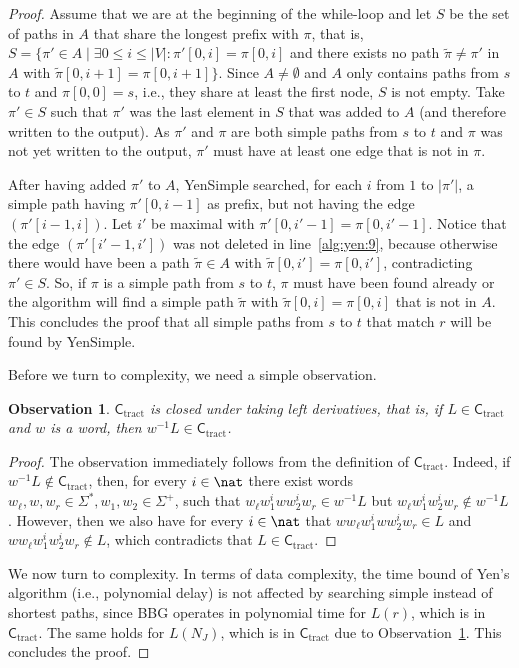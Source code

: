 \documentclass[a4paper,english]{lipics-v2016}
\newcommand{\ctract}{\ensuremath{\textsf{C}_\text{tract}}\xspace}
\theoremstyle{plain}
\newtheorem{observation}[theorem]{Observation}
\begin{document}
\begin{proof}
  Assume that we are at the beginning of the while-loop and let $S$ be
  the set of paths in $A$ that share the longest prefix with $\pi$,
  that is, $S =\{\pi' \in A \mid \exists 0 \leq i \leq |V|:
  \pi'[0,i]=\pi[0,i]$ and there exists no path $\tilde{\pi}\neq \pi'$
  in $A$ with $\tilde{\pi}[0,i+1]=\pi[0,i+1]\}$. Since $A \neq
  \emptyset$ and $A$ only contains paths from $s$ to $t$ and
  $\pi[0,0]=s$, i.e., they share at least the first node, $S$ is not
  empty. Take $\pi' \in S$ such that $\pi'$ was the last element in
  $S$ that was added to $A$ (and therefore written to the output).  As
  $\pi'$ and $\pi$ are both simple paths from $s$ to $t$ and $\pi$ was
  not yet written to the output, $\pi'$ must have at least one edge
  that is not in $\pi$.

  After having added $\pi'$ to $A$, YenSimple searched, for each $i$
  from $1$ to $|\pi'|$, a simple path having $\pi'[0,i-1]$ as prefix, but
  not having the edge $(\pi'[i-1,i])$. Let $i'$ be maximal with
  $\pi'[0,i'-1]=\pi[0,i'-1]$.  Notice that the edge $(\pi'[i'-1,i'])$ was
  not deleted in line~\ref{alg:yen:9}, because otherwise there would
  have been a path $\tilde{\pi} \in A$ with $\tilde{\pi}[0,i'] = \pi[0,i']$,
  contradicting $\pi' \in S$.  So, if $\pi$ is a simple path from $s$ to $t$, $\pi$
  must have been found already or the algorithm will find a
  simple path $\tilde{\pi}$ with $\tilde{\pi}[0,i] = \pi[0,i]$ that is
  not in $A$. This concludes the proof that all simple paths from $s$ to $t$ that
  match $r$ will be found by YenSimple.

 
  Before we turn to complexity, we need a simple observation. 
  \begin{observation}\label{obs:ctract-derivative}
    \ctract is closed under taking left derivatives, that is, if $L
    \in \ctract$ and $w$ is a word, then $w^{-1} L \in \ctract$.
  \end{observation}
  \begin{proof}
    The observation immediately follows from the definition of
    \ctract. Indeed, if $w^{-1}L \notin \ctract$, then, for every $i \in
    \nat$ there exist words $w_\ell, w,w_r \in \Sigma^*, w_1, w_2 \in
    \Sigma^+$, such that $w_\ell w_1^i w w_2^i w_r \in w^{-1}L$ but
    $w_\ell w_1^i w_2^i w_r \notin w^{-1}L$. However, then we also
    have for every $i \in \nat$ that
    $w w_\ell w_1^i w w_2^i w_r \in L$ and $ww_\ell w_1^i w_2^i
    w_r \notin L$, which contradicts that $L \in \ctract$.
  \end{proof}

  We now turn to complexity. In terms of data complexity, the time
  bound of Yen's algorithm (i.e., polynomial delay) is not affected by
  searching simple instead of shortest paths, since BBG operates in
  polynomial time for $L(r)$, which is in \ctract \cite[Lemma
  16]{bagan}. The same holds for $L(N_J)$, which is in \ctract due to
  Observation~\ref{obs:ctract-derivative}. This concludes the proof.
\end{proof}
\end{document}
